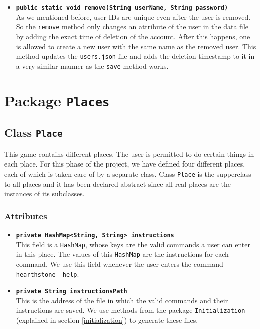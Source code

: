 \documentclass[a4paper]{article}
\begin{document}
\begin{itemize}
	\item \texttt{\textbf{public static void remove(String userName, String password)}}\\
	As we mentioned before, user IDs are unique even after the user is removed. So the \texttt{remove} method only changes an attribute of the user in the data file by adding the exact time of deletion of the account. After this happens, one is allowed to create a new user with the same name as the removed user. This method updates the \texttt{users.json} file and adds the deletion timestamp to it in a very similar manner as the \texttt{save} method works.
	
\end{itemize}

\clearpage
\section{Package \texttt{Places}}
\subsection{Class \texttt{Place}}
This game contains different places. The user is permitted to do certain things in each place. For this phase of the project, we have defined four different places, each of which is taken care of by a separate class. Class \texttt{Place} is the supperclass to all places and it has been declared abstract since all real places are the instances of its subclasses.

\subsubsection{Attributes}
\begin{itemize}
	\item \texttt{\textbf{private HashMap<String, String> instructions}}\\
	This field is a \texttt{HashMap}, whose keys are the valid commands a user can enter in this place. The values of this \texttt{HashMap} are the instructions for each command. We use this field whenever the user enters the command \texttt{hearthstone --help}.
	
	\item \texttt{\textbf{private String instructionsPath}}\\
	This is the address of the file in which the valid commands and their instructions are saved. We use methods from the package \texttt{Initialization} (explained in section \ref{initialization}) to generate these files.
\end{itemize}
\end{document}
